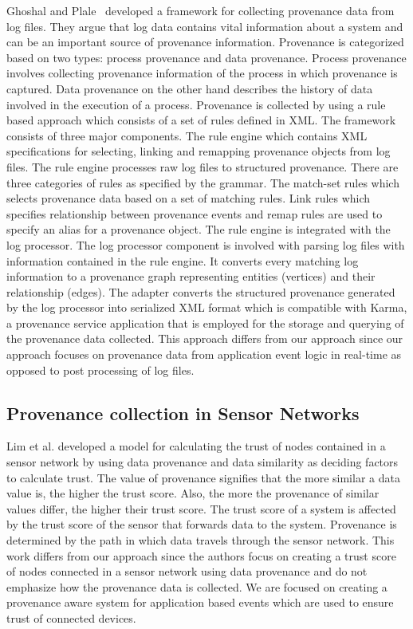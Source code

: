 Ghoshal and Plale~\cite{ghoshal_provenance_2013} developed a framework for collecting provenance data from log files. They argue that log data contains vital information about a system and can be an important source of provenance information. Provenance is categorized based on two types: process provenance and data provenance. Process provenance involves collecting provenance information of the process in which provenance is captured. Data provenance on the other hand describes the history of data involved in the execution of a process. Provenance is collected by using a rule based approach which consists of a set of rules defined in XML. The framework consists of three major components. The rule engine which contains XML specifications for selecting, linking and remapping provenance objects from log files. The rule engine processes raw log files to structured provenance. There are three categories of rules as specified by the grammar. The match-set rules which selects provenance data based on a set of matching rules. Link rules which specifies relationship between provenance events and remap rules are used to specify an alias for a provenance object. The rule engine is integrated with the log processor. The log processor component is involved with parsing log files with information contained in the rule engine. It converts every matching log information to a provenance graph representing entities (vertices) and their relationship (edges). The adapter converts the structured provenance generated by the log processor into serialized XML format which is compatible with Karma, a provenance service application that is employed for the storage and querying of the provenance data collected. This approach differs from our approach since our approach focuses on provenance data from application event logic in real-time as opposed to post processing of log files.

\subsection{Provenance collection in Sensor Networks}
Lim et al. \cite{lim} developed a
model for calculating the trust of nodes contained in a sensor network by using data
provenance and data similarity as deciding factors to calculate trust. The value of
provenance signifies that the more similar a data value is, the higher the trust score.
Also, the more the provenance of similar values differ, the higher their trust score. The trust score of a system is affected by the trust score of the sensor that forwards data to the system. Provenance is determined by the path in which data travels through the sensor network. This work differs from our approach since the authors focus on creating a trust score
of nodes connected in a sensor network using data provenance and do not emphasize
how the provenance data is collected. We are focused on creating a
provenance aware system for application based events which are used to ensure trust of
connected devices. 

